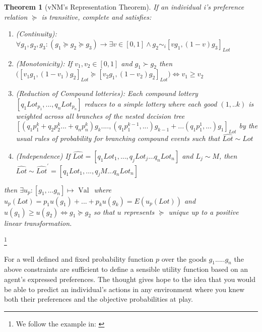 \documentclass{tufte-handout}
\newtheorem{theo}[section]{Theorem}
\newenvironment{ftheo}[1]
  {\begin{mdframed}
  \sloppy
  \begin{theo}[#1]
  }
  {\end{theo}
\end{mdframed}}
\begin{document}
\begin{ftheo}{vNM's Representation Theorem}
If an individual i's preference relation $\succeq$ is transitive, complete and satisfies: \begin{enumerate}
\item (Continuity): $\forall g_{1} , g_{2} , g_{3} : ( g_{1} \succeq g_{2} \succeq g_{3}) \rightarrow \exists v \in [0, 1] \wedge g_{2} \sim_{i} [v g_{1}, (1-v) g_{3}]_{Lot}$
\item (Monotonicity): If $ v_{1}, v_{2} \in [0, 1]$ and $ g_{1} \succ g_{2}$ then  $ \Big( [ v_{1} g_{1}, (1-v_{1})g_{2}]_{Lot} \succeq [ v_{2} g_{1}, (1-v_{2})g_{2}]_{Lot} \Big) \Leftrightarrow v_{1} \geq v_{2}$
\item (Reduction of Compound lotteries): Each compound lottery ${[q_{1}Lot_{p_{1}}, ...,  q_{n}Lot_{p_{n}}]}$ reduces to a simple lottery where each good $(1, .. k)$ is weighted across all branches of the nested decision tree ${[(q_{1}p^{k}_{1} + q_{2}p^{k}_{2} ... + q_{n}p^{k}_{n})g_{k} .... , (q_{1}p^{k-1}_{1} , ...)g_{k-1} + ... (q_{1}p^{1}_{1} , ...)g_{1}]_{Lot}}$ by the usual rules of probability for branching compound events such that $\widehat{Lot} \sim Lot$
\item (Independence) If $\widehat{Lot} = [q_{1}Lot_{1}, ..., q_{j}Lot_{j}...q_{n}Lot_{n}]$ and $L_{j} \sim M$, then $\widehat{Lot} \sim \widehat{Lot}^{'} = [q_{1}Lot_{1}, ..., q_{j}M...q_{n}Lot_{n}]$ 
\end{enumerate}  
then $\exists u_{p} : [ g_{1}, ... g_{n}] \mapsto \text{ Val } $ where 
$ u_{p}(Lot) = p_{1}u(g_{1}) + ... + p_{k}u(g_{k}) = E(u_{p}(Lot))$ and  $u(g_{1}) \geq u(g_{2}) \Leftrightarrow g_{1} \succeq g_{2}$ so that $u$ represents $\succeq$ unique up to a positive linear transformation.
\end{ftheo}\footnote{We follow the example in: \cite{GameTheory}}

\noindent For a well defined and fixed probability function $p$ over the goods $g_{1} ..... g_{n}$ the above constraints are sufficient to define a sensible utility function based on an agent's expressed preferences. The thought gives hope to the idea that you would be able to predict an individual's actions in any environment where you knew both their preferences and the objective probabilities at play.



\end{document}
